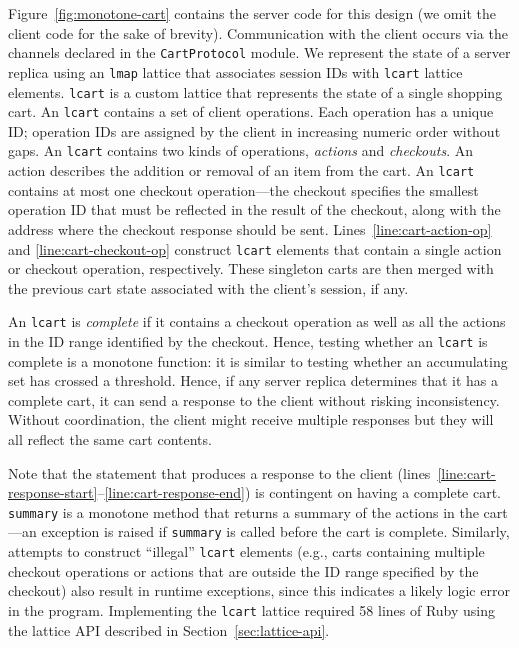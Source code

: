 
Figure~\ref{fig:monotone-cart} contains the server code for this design (we omit
the client code for the sake of brevity). Communication with the client occurs
via the channels declared in the \texttt{CartProtocol} module. We represent the
state of a server replica using an \texttt{lmap} lattice that associates session
IDs with \texttt{lcart} lattice elements. \texttt{lcart} is a custom lattice
that represents the state of a single shopping cart. An \texttt{lcart} contains
a set of client operations. Each operation has a unique ID; operation IDs are
assigned by the client in increasing numeric order without gaps. An
\texttt{lcart} contains two kinds of operations, \emph{actions} and
\emph{checkouts}. An action describes the addition or removal of an item from
the cart. An \texttt{lcart} contains at most one checkout operation---the
checkout specifies the smallest operation ID that must be reflected in the
result of the checkout, along with the address where the checkout response
should be sent.  Lines~\ref{line:cart-action-op} and \ref{line:cart-checkout-op}
construct \texttt{lcart} elements that contain a single action or checkout
operation, respectively. These singleton carts are then merged with the previous
cart state associated with the client's session, if any.

An \texttt{lcart} is \emph{complete} if it contains a checkout operation as well
as all the actions in the ID range identified by the checkout. Hence, testing
whether an \texttt{lcart} is complete is a monotone function: it is similar to
testing whether an accumulating set has crossed a threshold. Hence, if any
server replica determines that it has a complete cart, it can send a response to
the client without risking inconsistency. Without coordination, the client might
receive multiple responses but they will all reflect the same cart contents.

Note that the statement that produces a response to the client
(lines~\ref{line:cart-response-start}--\ref{line:cart-response-end}) is
contingent on having a complete cart. \texttt{summary} is a monotone method that
returns a summary of the actions in the cart---an exception is raised if
\texttt{summary} is called before the cart is complete. Similarly, attempts to
construct ``illegal'' \texttt{lcart} elements (e.g., carts containing multiple
checkout operations or actions that are outside the ID range specified by the
checkout) also result in runtime exceptions, since this indicates a likely logic
error in the program. Implementing the \texttt{lcart} lattice required 58 lines
of Ruby using the lattice API described in Section~\ref{sec:lattice-api}.

